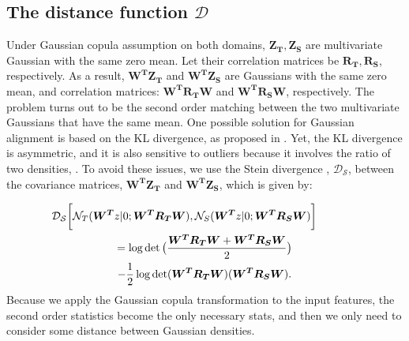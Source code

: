 \documentclass{article}
\begin{document}
	\subsection{The distance function $\mathcal{D}$ } 
    \label{stein}
	Under Gaussian copula assumption on both domains, $ \boldsymbol{Z_T} , \boldsymbol{Z_S} $ are multivariate Gaussian with the same zero mean. Let their correlation matrices be $\boldsymbol{R_T}, \boldsymbol{R_S} $, respectively. As a result, $ \boldsymbol{W^T} \boldsymbol{Z_T} $ and   $ \boldsymbol{W^T} \boldsymbol{Z_S}$ are Gaussians with the same zero mean, and correlation matrices: $\boldsymbol{W^T} \boldsymbol{R_T} \boldsymbol{W}$ and $\boldsymbol{W^T} \boldsymbol{ R_S} \boldsymbol{ W} $, respectively. The problem turns out to be the second order matching between the two multivariate Gaussians that have the same mean.
One possible solution for Gaussian alignment is based on the KL divergence, as proposed in \cite{DBLP:dblp_conf/icassp/BayestehtashkSB16}. Yet, the KL divergence is asymmetric, and it is also sensitive to outliers because it involves the ratio of two densities, \cite{DBLP:journals/jmlr/Abou-MoustafaF12}. To avoid these issues, we use the Stein divergence \cite{DBLP:journals/corr/HerathHP16a}, $\mathcal{D_{S}}$, between the covariance matrices, $\boldsymbol{W^T} \boldsymbol{Z_T}$ and $\boldsymbol{W^T} \boldsymbol{Z_S}$, which is given by: 
	
	\vspace{-0.5cm}
	\begin{multline} 
\hspace{-1em} \mathcal{D_{S}} \bigg[ \mathcal{N}_T (\boldsymbol{W^T} z| 0; \boldsymbol{W^T} \boldsymbol{R_T}  \boldsymbol{W}), \mathcal{N}_S (\boldsymbol{W^T} z|0;\boldsymbol{W^T} \boldsymbol{R_S} \boldsymbol{W})    \bigg]   \   \     \  \      \   \     \  \   \\
	= \log \det \big( \frac{\boldsymbol{W^T} \boldsymbol{R_T}  \boldsymbol{W}  +\boldsymbol{W^T} \boldsymbol{R_S} \boldsymbol{W}}{2}\big) \\
    -\frac{1}{2} \log \det ( \boldsymbol{W^T} \boldsymbol{R_T} \boldsymbol{W}) (\boldsymbol{W^T} \boldsymbol{R_S}  \boldsymbol{W}).
    \end{multline}
Because we apply the Gaussian copula transformation to the input features, the second order statistics become the only necessary stats, and then we only need to consider some distance between Gaussian densities. 
\end{document}
